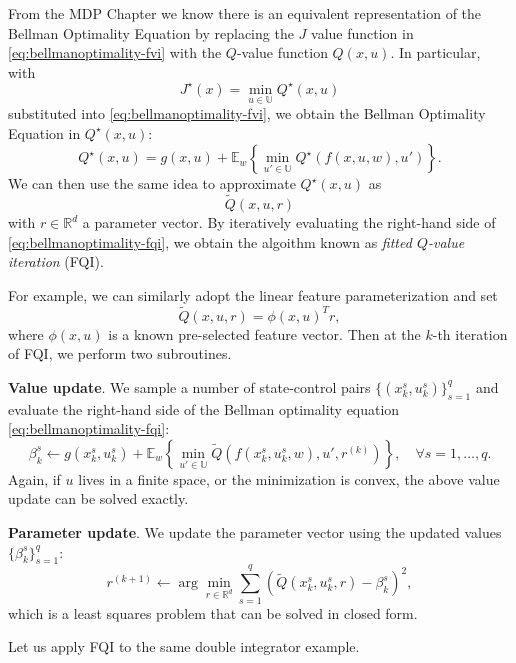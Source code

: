 \documentclass[
]{book}
\theoremstyle{definition}
\theoremstyle{definition}
\theoremstyle{definition}
\theoremstyle{definition}
\theoremstyle{remark}
\begin{document}
From the MDP Chapter we know there is an equivalent representation of the Bellman Optimality Equation by replacing the \(J\) value function in \eqref{eq:bellmanoptimality-fvi} with the \(Q\)-value function \(Q(x,u)\). In particular, with
\[
J^\star(x) = \min_{u \in \mathbb{U}} Q^\star(x,u)
\]
substituted into \eqref{eq:bellmanoptimality-fvi}, we obtain the Bellman Optimality Equation in \(Q^\star(x,u)\):
\begin{equation}
Q^\star(x,u) =  g(x,u) + \mathbb{E}_w \left\{ \min_{u' \in \mathbb{U}} Q^\star(f(x,u,w),u') \right\}.
\label{eq:bellmanoptimality-fqi}
\end{equation}
We can then use the same idea to approximate \(Q^\star(x,u)\) as
\[
\tilde{Q}(x,u,r)
\]
with \(r \in \mathbb{R}^d\) a parameter vector. By iteratively evaluating the right-hand side of \eqref{eq:bellmanoptimality-fqi}, we obtain the algoithm known as \emph{fitted \(Q\)-value iteration} (FQI).

For example, we can similarly adopt the linear feature parameterization and set
\[
\tilde{Q}(x,u,r) = \phi(x,u)^T r,
\]
where \(\phi(x,u)\) is a known pre-selected feature vector. Then at the \(k\)-th iteration of FQI, we perform two subroutines.

\textbf{Value update}. We sample a number of state-control pairs \(\{(x_k^s,u_k^s) \}_{s=1}^q\) and evaluate the right-hand side of the Bellman optimality equation \eqref{eq:bellmanoptimality-fqi}:
\begin{equation}
\beta_k^s \leftarrow g(x_k^s,u_k^s) + \mathbb{E}_w \left\{ \min_{u' \in \mathbb{U}} \tilde{Q}(f(x_k^s,u_k^s,w),u',r^{(k)}) \right\}, \quad \forall s = 1,\dots,q.
\label{eq:fqi-value-update}
\end{equation}
Again, if \(u\) lives in a finite space, or the minimization is convex, the above value update can be solved exactly.

\textbf{Parameter update}. We update the parameter vector using the updated values \(\{ \beta_k^s \}_{s=1}^q\):
\begin{equation}
r^{(k+1)} \leftarrow \arg\min_{r \in \mathbb{R}^d} \sum_{s=1}^q \left( \tilde{Q}(x_k^s,u_k^s,r) - \beta_k^s \right)^2,
\label{eq:fqi-parameter-update}
\end{equation}
which is a least squares problem that can be solved in closed form.

Let us apply FQI to the same double integrator example.
\end{document}
